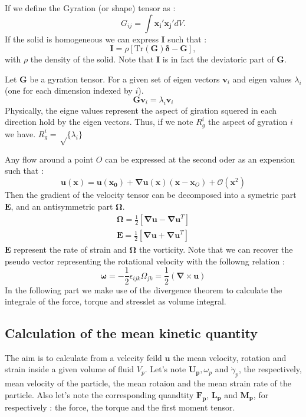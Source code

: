 \documentclass[10pt,a4paper,openany]{article}
\theoremstyle{mytheoremstyle}
\theoremstyle{mytheoremstyle}
\theoremstyle{myproblemstyle}
\begin{document}
If we define the Gyration (or shape) tensor as :
\begin{equation}
    G_{ij} = \int \bm{x_i'}\bm{x_j'} dV.
\end{equation}
If the solid is homogeneous we can express $\bm{I}$ such that : 
\begin{equation}
    \bm{I} = \rho\left[\text{Tr}(\bm{G})\bm{\delta} - \bm{G}\right],
\end{equation}
with $\rho$ the density of the solid. 
Note that $\bm{I}$ is in fact the deviatoric part of $\bm{G}$.  
\begin{definition}
    Let $\bm{G}$ be a gyration tensor. 
    For a given set of eigen vectors $\bm{v}_i$ and eigen values $\lambda_i$ (one for each dimension indexed by $i$). 
    $$\bm{G}\bm{v}_i = \lambda_i \bm{v}_i$$
    Physically, the eigne values represent the aspect of giration squered in each direction hold by the eigen vectors. 
    Thus, if we note $R_g^i$ the aspect of gyration $i$ we have.
    $R_g^i = \sqrt\{\lambda_i\} $
\end{definition}
Any flow around a point $O$ can be expressed at the second oder as an expension such that \citep{guazzelli2011} : 
\begin{equation}
    \bm{u}(\bm{x}) = \bm{u}(\bm{x_0}) + \bm{\nabla}\bm{u}(\bm{x})(\bm{x} - \bm{x}_O) + \mathcal{O}(\bm{x}^2)
\end{equation}
Then the gradient of the velocity tensor can be decomposed into a symetric part $\bm{E}$, and an antisymmetric part $\bm{\Omega}$.
\begin{align*}
    \bm{\Omega} = \frac{1}{2}\left[\bm{\nabla u} -\bm{\nabla u}^T\right]\\
    \bm{E} = \frac{1}{2}\left[\bm{\nabla u} +\bm{\nabla u}^T\right]
\end{align*}
$\bm{E}$ represent the rate of strain and $\bm{\Omega}$ the vorticity. 
Note that we can recover the pseudo vector representing the rotational velocity with the followng relation :
\begin{equation*}
    \bm{\omega} = -\frac{1}{2} \epsilon_{ijk}\Omega_{jk} = \frac{1}{2} \left(\bm{\nabla}\times \bm{u}\right)
\end{equation*}
In the following part we make use of the divergence theorem to calculate the integrale of the force, torque and stresslet as volume integral. 


\subsection{Calculation of the mean kinetic quantity}
The aim is to calculate from a velecity feild $\bm{u}$ the mean velocity, rotation and strain inside a given volume of fluid $V_p$.
Let's note $\bm{U_p},\omega_p$ and $\dot{\gamma}_p$, the respectively, mean velocity of the particle, the mean rotaion and the mean strain rate of the particle. 
Also let's note the corresponding quandtity $\bm{F_p}$, $\bm{L_p}$ and $\bm{M_p}$, for respectively :
the force, the torque and the first moment tensor. 
\end{document}
